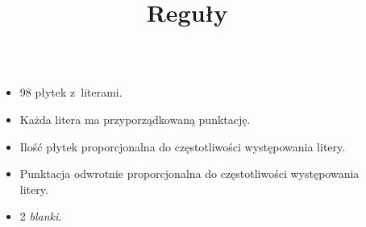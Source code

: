 \documentclass[10pt,a4paper]{beamer}
\begin{document}
\begin{frame}
\begin{columns}[onlytextwidth]
\begin{column}{0.6\textwidth}
		\end{column}
		\begin{column}{0.4\textwidth}
			\begin{itemize}
				\item 98 płytek z~literami.
				\item Każda litera ma przyporządkowaną punktację.
				\item Ilość płytek proporcjonalna do częstotliwości występowania litery.
				\item Punktacja odwrotnie proporcjonalna do częstotliwości występowania litery.
				\item 2 \emph{blanki}.
			\end{itemize}
		\end{column}
	\end{columns}
\end{frame}

\begin{frame}
	\title{Reguły}
\end{frame}
\end{document}
